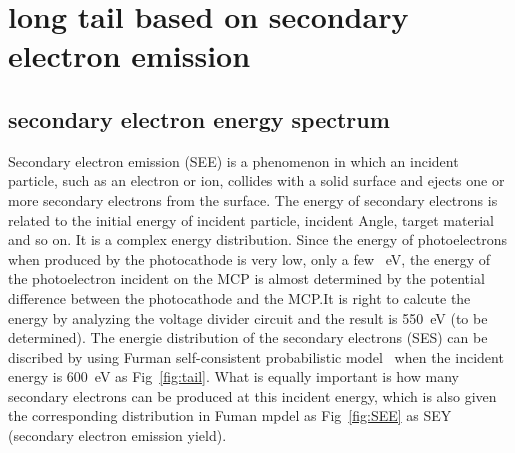 \documentclass{article}
\begin{document}
\section{long tail based on secondary electron emission}\label{sec:see}


\subsection{secondary electron energy spectrum}\label{subsec:fuman}
Secondary electron emission (SEE) is a phenomenon in which an incident particle, such as an electron or ion,
collides with a solid surface and ejects one or more secondary electrons from the surface.
The energy of secondary electrons is related to the initial energy of incident particle, incident Angle, target material and so on.
It is a complex energy distribution.
Since the energy of photoelectrons when produced by the photocathode is very low, only a few \SI{}{eV},
the energy of the photoelectron incident on the MCP is almost determined by the potential difference
between the photocathode and the MCP.\@ It is right to calcute the energy by analyzing the voltage divider circuit and the result is \SI{550}{eV} (to be determined).
The energie distribution of the secondary electrons (SES) can be discribed by using Furman self-consistent probabilistic model~\cite{2002Probabilistic}
when the incident energy is \SI{600}{eV} as Fig~\ref{fig:tail}.
What is equally important is how many secondary electrons can be produced at this incident energy,
which is also given the corresponding distribution in Fuman mpdel\cite{2002Probabilistic} as Fig~\ref{fig:SEE}
as SEY (secondary electron emission yield).
\end{document}
